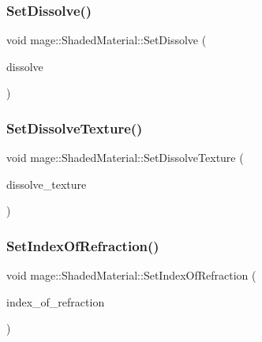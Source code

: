 \subsubsection{\texorpdfstring{Set\+Dissolve()}{SetDissolve()}}
{\footnotesize\ttfamily void mage\+::\+Shaded\+Material\+::\+Set\+Dissolve (\begin{DoxyParamCaption}\item[{float}]{dissolve }\end{DoxyParamCaption})\hspace{0.3cm}{\ttfamily [noexcept]}}

\hypertarget{structmage_1_1_shaded_material_ab7f2f36caddb8bbdde8753424968c231}{}\label{structmage_1_1_shaded_material_ab7f2f36caddb8bbdde8753424968c231} 
\subsubsection{\texorpdfstring{Set\+Dissolve\+Texture()}{SetDissolveTexture()}}
{\footnotesize\ttfamily void mage\+::\+Shaded\+Material\+::\+Set\+Dissolve\+Texture (\begin{DoxyParamCaption}\item[{\hyperlink{namespacemage_a1e01ae66713838a7a67d30e44c67703e}{Shared\+Ptr}$<$ \hyperlink{classmage_1_1_texture}{Texture} $>$}]{dissolve\+\_\+texture }\end{DoxyParamCaption})}

\hypertarget{structmage_1_1_shaded_material_af287d28549dc682fe4f067a6e30b71a8}{}\label{structmage_1_1_shaded_material_af287d28549dc682fe4f067a6e30b71a8} 
\subsubsection{\texorpdfstring{Set\+Index\+Of\+Refraction()}{SetIndexOfRefraction()}}
{\footnotesize\ttfamily void mage\+::\+Shaded\+Material\+::\+Set\+Index\+Of\+Refraction (\begin{DoxyParamCaption}\item[{float}]{index\+\_\+of\+\_\+refraction }\end{DoxyParamCaption})\hspace{0.3cm}{\ttfamily [noexcept]}}

